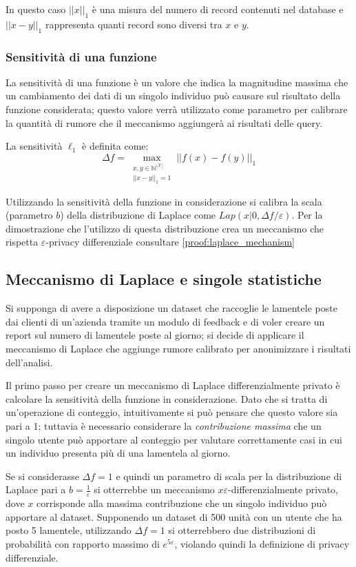 In questo caso $||x||_1$ è una misura del numero di record contenuti nel database e $||x - y||_1$ rappresenta quanti record sono diversi tra $x$ e $y$.

\subsubsection{Sensitività di una funzione}
La sensitività di una funzione è un valore che indica la magnitudine massima che un cambiamento dei dati di un singolo individuo può causare sul risultato della funzione considerata; questo valore verrà utilizzato come parametro per calibrare la quantità di rumore che il meccanismo aggiungerà ai risultati delle query.

La sensitività $\ell_1$ è definita come:
\begin{equation}
    \label{eq:sensitivity}
    \Delta f = \max_{\substack{x,y \in \mathbb{N}^{|\mathcal{X}|}\\||x - y||_1 = 1}} ||f(x) - f(y)||_1
\end{equation}

Utilizzando la sensitività della funzione in considerazione si calibra la scala (parametro $b$) della distribuzione di Laplace come $Lap(x|0,\Delta f/\varepsilon)$. Per la dimostrazione che l'utilizzo di questa distribuzione crea un meccanismo che rispetta $\varepsilon$-privacy differenziale consultare \ref{proof:laplace_mechanism}

\subsection{Meccanismo di Laplace e singole statistiche}
Si supponga di avere a disposizione un dataset che raccoglie le lamentele poste dai clienti di un'azienda tramite un modulo di feedback e di voler creare un report sul numero di lamentele poste al giorno; si decide di applicare il meccanismo di Laplace che aggiunge rumore calibrato per anonimizzare i risultati dell'analisi.

Il primo passo per creare un meccanismo di Laplace differenzialmente privato è calcolare la sensitività della funzione in considerazione. Dato che si tratta di un'operazione di conteggio, intuitivamente si può pensare che questo valore sia pari a 1; tuttavia è necessario considerare la \textit{contribuzione massima} che un singolo utente può apportare al conteggio per valutare correttamente casi in cui un individuo presenta più di una lamentela al giorno.

Se si considerasse $\Delta f = 1$ e quindi un parametro di scala per la distribuzione di Laplace pari a $b = \frac{1}{\varepsilon}$ si otterrebbe un meccanismo $x\varepsilon$-differenzialmente privato, dove $x$ corrisponde alla massima contribuzione che un singolo individuo può apportare al dataset. Supponendo un dataset di 500 unità con un utente che ha posto 5 lamentele, utilizzando $\Delta f = 1$ si otterrebbero due distribuzioni di probabilità con rapporto massimo di $e^{5\varepsilon}$, violando quindi la definizione di privacy differenziale.

